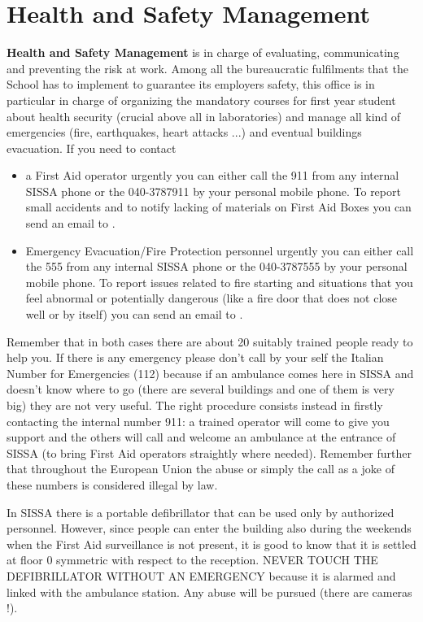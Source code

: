 \documentclass{sissavademecum}
\begin{document}
\chapter{Health and Safety Management}

\textbf{Health and Safety Management} is in charge of evaluating, communicating and preventing the risk at work. Among all the bureaucratic fulfilments that the School has to implement to guarantee its employers safety, this office is in particular in charge of organizing the mandatory courses for first year student about health security (crucial above all in laboratories) and manage all kind of emergencies (fire, earthquakes, heart attacks ...) and eventual buildings evacuation. If you need to contact
\begin{itemize}
	\item  a First Aid operator urgently you can either call the \textcolor[rgb]{0.06666667,0.33333334,0.8}{911} from any internal SISSA phone or the 040-3787911 by your personal mobile phone. To report small accidents and to notify lacking of materials on First Aid Boxes you can send an email to . 
	\item Emergency Evacuation/Fire Protection personnel urgently you can either call the \textcolor[rgb]{0.06666667,0.33333334,0.8}{555} from any internal SISSA phone or the 040-3787555 by your personal mobile phone. To report issues related to fire starting and situations that you feel abnormal or potentially dangerous (like a fire door that does not close well or by itself) you can send an email to . 
\end{itemize}
Remember that in both cases there are about 20 suitably trained people ready to help you. If there is any emergency please don't call by your self the Italian Number for Emergencies (112) because if an ambulance comes here in SISSA and doesn't know where to go (there are several buildings and one of them is very big) they are not very useful. The right procedure consists instead in firstly contacting the internal number 911: a trained operator will come to give you support and the others will call and welcome an ambulance at the entrance of SISSA (to bring First Aid operators straightly where needed). Remember further that throughout the European Union the abuse or simply the call as a joke of these numbers is considered illegal by law. 

In SISSA there is a portable defibrillator that can be used only by authorized personnel. However, since people can enter the building also during the weekends when the First Aid surveillance is not present, it is good to know that it is settled at floor $0$ symmetric with respect to the reception. NEVER TOUCH THE DEFIBRILLATOR WITHOUT AN EMERGENCY because it is alarmed and linked with the ambulance station. Any abuse will be pursued (there are cameras !). 
\end{document}
